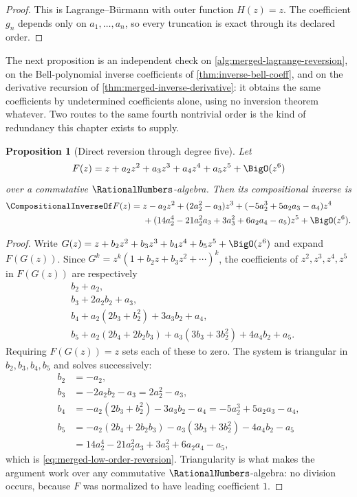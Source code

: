 \documentclass[11pt,a4paper,oneside,openany]{book}
\newtheorem{proposition}[theorem]{Proposition}
\theoremstyle{definition}
\theoremstyle{remark}
\begin{document}
\begin{proof}
This is Lagrange--Bürmann with outer function $H(z)=z$.  The coefficient
$g_n$ depends only on $a_1,\ldots,a_n$, so every truncation is exact through
its declared order.
\end{proof}

The next proposition is an independent check on
\cref{alg:merged-lagrange-reversion}, on the Bell-polynomial inverse
coefficients of \cref{thm:inverse-bell-coeff}, and on the derivative recursion
of \cref{thm:merged-inverse-derivative}: it obtains the same coefficients by
undetermined coefficients alone, using no inversion theorem whatever.  Two
routes to the same fourth nontrivial order is the kind of redundancy this
chapter exists to supply.

\begin{proposition}[Direct reversion through degree five]
\label{prop:merged-low-order-reversion}
Let
\[
 F(z)=z+a_2z^2+a_3z^3+a_4z^4+a_5z^5+\BigO(z^6)
\]
over a commutative $\RationalNumbers$-algebra.  Then its compositional inverse
is
\begin{align}
 \CompositionalInverseOf F(z)
 ={}&z-a_2z^2+(2a_2^2-a_3)z^3
  +(-5a_2^3+5a_2a_3-a_4)z^4                                        \notag\\
 &+(14a_2^4-21a_2^2a_3+3a_3^2+6a_2a_4-a_5)z^5+\BigO(z^6).          \label{eq:merged-low-order-reversion}
\end{align}
\end{proposition}

\begin{proof}
Write $G(z)=z+b_2z^2+b_3z^3+b_4z^4+b_5z^5+\BigO(z^6)$ and expand $F(G(z))$.
Since $G^k=z^k(1+b_2z+b_3z^2+\cdots)^k$, the coefficients of
$z^2,z^3,z^4,z^5$ in $F(G(z))$ are respectively
\begin{align*}
 &b_2+a_2,\\
 &b_3+2a_2b_2+a_3,\\
 &b_4+a_2(2b_3+b_2^2)+3a_3b_2+a_4,\\
 &b_5+a_2(2b_4+2b_2b_3)+a_3(3b_3+3b_2^2)+4a_4b_2+a_5.
\end{align*}
Requiring $F(G(z))=z$ sets each of these to zero.  The system is triangular in
$b_2,b_3,b_4,b_5$ and solves successively:
\begin{align*}
 b_2&=-a_2,\\
 b_3&=-2a_2b_2-a_3=2a_2^2-a_3,\\
 b_4&=-a_2(2b_3+b_2^2)-3a_3b_2-a_4=-5a_2^3+5a_2a_3-a_4,\\
 b_5&=-a_2(2b_4+2b_2b_3)-a_3(3b_3+3b_2^2)-4a_4b_2-a_5\\
    &=14a_2^4-21a_2^2a_3+3a_3^2+6a_2a_4-a_5,
\end{align*}
which is \eqref{eq:merged-low-order-reversion}.  Triangularity is what makes
the argument work over any commutative $\RationalNumbers$-algebra: no division
occurs, because $F$ was normalized to have leading coefficient $1$.
\end{proof}
\end{document}
